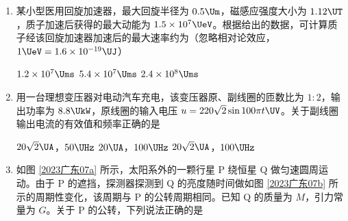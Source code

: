 \documentclass[\gkver]{gaokaozhenti}
\begin{document}
\begin{enumerate}
\item
某小型医用回旋加速器，最大回旋半径为 $0.5 \Um$，磁感应强度大小为 $1.12 \UT$，质子加速后获得的最大动能为 $1.5\times10^{7} \UeV$。根据给出的数据，可计算质子经该回旋加速器加速后的最大速率约为（忽略相对论效应，$1 \UeV = 1.6\times10^{-19} \UJ$）

{$1.2\times10^{7} \Ums$}
{$5.4\times10^{7} \Ums$}
{$2.4\times10^{8} \Ums$}


\item
用一台理想变压器对电动汽车充电，该变压器原、副线圈的匝数比为 $1:2$，输出功率为 $8.8 \UkW$，原线圈的输入电压 $u = 220\sqrt{2}\sin 100\pi t \UV$。关于副线圈输出电流的有效值和频率正确的是

{$20\sqrt{2} \UA$，$50 \UHz$}
{$20 \UA$，$100 \UHz$}
{$20\sqrt{2} \UA$，$100 \UHz$}


\item
如图 \ref{2023广东07a} 所示，太阳系外的一颗行星 P 绕恒星 Q 做匀速圆周运动。由于 P 的遮挡，探测器探测到 Q 的亮度随时间做如图 \ref{2023广东07b} 所示的周期性变化，该周期与 P 的公转周期相同。已知 Q 的质量为 $M$，引力常量为 $G$。关于 P 的公转，下列说法正确的是


\end{enumerate}
\end{document}
